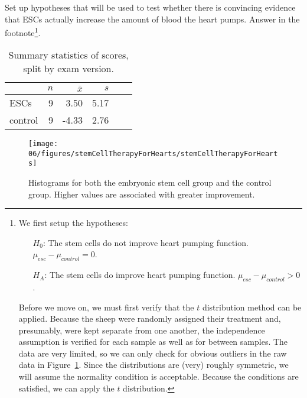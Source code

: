 \begin{exercise} \label{exerciseToEvaluteWhetherESCsAreHelpfulInImprovingHeartFunctionInSheep}
Set up hypotheses that will be used to test whether there is convincing evidence that ESCs actually increase the amount of blood the heart pumps. Answer in the footnote\footnote{We first setup the hypotheses:
\begin{itemize}
\item[$H_0$:] The stem cells do not improve heart pumping function. $\mu_{esc} - \mu_{control} = 0$.
\item[$H_A$:] The stem cells do improve heart pumping function. $\mu_{esc} - \mu_{control} > 0$.
\end{itemize}
Before we move on, we must first verify that the $t$ distribution method can be applied. Because the sheep were randomly assigned their treatment and, presumably, were kept separate from one another, the independence assumption is verified for each sample as well as for between samples. The data are very limited, so we can only check for obvious outliers in the raw data in Figure~\ref{stemCellTherapyForHearts}. Since the distributions are (very) roughly symmetric, we will assume the normality condition is acceptable. Because the conditions are satisfied, we can apply the $t$ distribution.}.
\end{exercise}

\begin{table}
\centering
\begin{tabular}{l rrrrr}
\hline
\hspace{10mm}	& $n$	& $\bar{x}$	& $s$  	 \\
\hline
ESCs		& 9		& 3.50		& 5.17  	\\
control		& 9		& -4.33		& 2.76  	 \\
\hline
\end{tabular}
\caption{Summary statistics of scores, split by exam version.}
\label{summaryStatsForSheepHeartDataWhoReceivedMiceESCs}
\end{table}

\begin{figure}
\centering
\texttt{[image: 06/figures/stemCellTherapyForHearts/stemCellTherapyForHearts]}
\caption{Histograms for both the embryonic stem cell group and the control group. Higher values are associated with greater improvement.}
\label{stemCellTherapyForHearts}
\end{figure}

